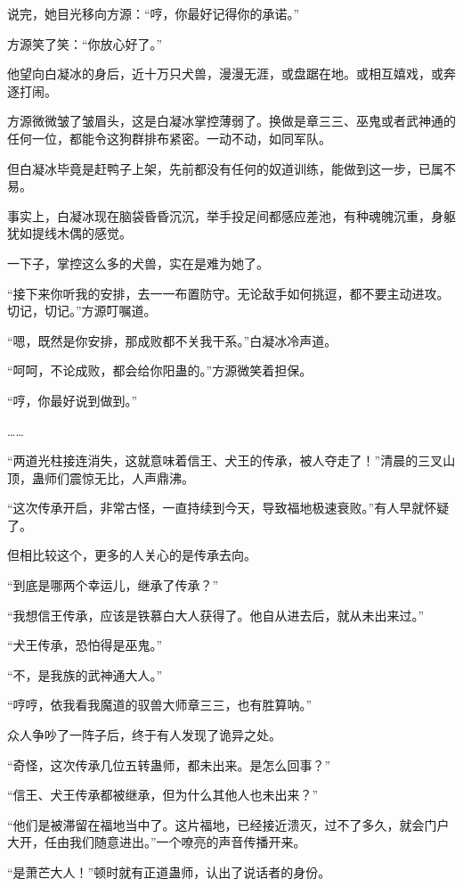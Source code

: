 \begin{this_body}
说完，她目光移向方源：“哼，你最好记得你的承诺。”

方源笑了笑：“你放心好了。”

他望向白凝冰的身后，近十万只犬兽，漫漫无涯，或盘踞在地。或相互嬉戏，或奔逐打闹。

方源微微皱了皱眉头，这是白凝冰掌控薄弱了。换做是章三三、巫鬼或者武神通的任何一位，都能令这狗群排布紧密。一动不动，如同军队。

但白凝冰毕竟是赶鸭子上架，先前都没有任何的奴道训练，能做到这一步，已属不易。

事实上，白凝冰现在脑袋昏昏沉沉，举手投足间都感应差池，有种魂魄沉重，身躯犹如提线木偶的感觉。

一下子，掌控这么多的犬兽，实在是难为她了。

“接下来你听我的安排，去一一布置防守。无论敌手如何挑逗，都不要主动进攻。切记，切记。”方源叮嘱道。

“嗯，既然是你安排，那成败都不关我干系。”白凝冰冷声道。

“呵呵，不论成败，都会给你阳蛊的。”方源微笑着担保。

“哼，你最好说到做到。”

……

“两道光柱接连消失，这就意味着信王、犬王的传承，被人夺走了！”清晨的三叉山顶，蛊师们震惊无比，人声鼎沸。

“这次传承开启，非常古怪，一直持续到今天，导致福地极速衰败。”有人早就怀疑了。

但相比较这个，更多的人关心的是传承去向。

“到底是哪两个幸运儿，继承了传承？”

“我想信王传承，应该是铁慕白大人获得了。他自从进去后，就从未出来过。”

“犬王传承，恐怕得是巫鬼。”

“不，是我族的武神通大人。”

“哼哼，依我看我魔道的驭兽大师章三三，也有胜算呐。”

众人争吵了一阵子后，终于有人发现了诡异之处。

“奇怪，这次传承几位五转蛊师，都未出来。是怎么回事？”

“信王、犬王传承都被继承，但为什么其他人也未出来？”

“他们是被滞留在福地当中了。这片福地，已经接近溃灭，过不了多久，就会门户大开，任由我们随意进出。”一个嘹亮的声音传播开来。

“是萧芒大人！”顿时就有正道蛊师，认出了说话者的身份。


\end{this_body}
